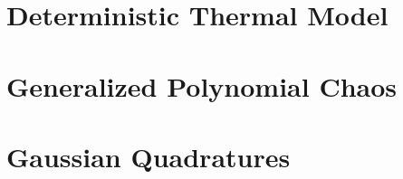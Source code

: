 \renewcommand{\thesection}{S\arabic{section}}
\renewcommand{\thetable}{S\arabic{table}}
\renewcommand{\thefigure}{S\arabic{figure}}
\setcounter{table}{0}
\setcounter{figure}{0}

\section{Deterministic Thermal Model} 


\section{Generalized Polynomial Chaos}   


\balance

\section{Gaussian Quadratures} 


% 

